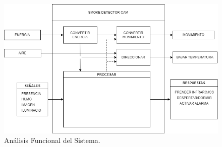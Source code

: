 \begin{figure}[H]
\centering
\begin{adjustbox}{width=\linewidth}
  \includegraphics{media/analisis_sistema.png}
\end{adjustbox}
\caption{\label{fig:analisis_funcional}Análisis Funcional del Sistema.}
\end{figure}

